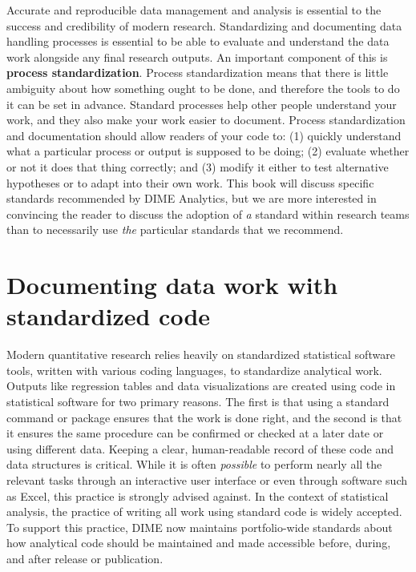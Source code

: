 {Accurate and reproducible data management and analysis
is essential to the success and credibility of modern research.
Standardizing and documenting data handling processes is essential
to be able to evaluate and understand
the data work alongside any final research outputs.
An important component of this is \textbf{process standardization}.
Process standardization means that there is
little ambiguity about how something ought to be done,
and therefore the tools to do it can be set in advance.
Standard processes help other people understand your work,
and they also make your work easier to document.
Process standardization and documentation should allow readers of your code to:
(1) quickly understand what a particular process or output is supposed to be doing;
(2) evaluate whether or not it does that thing correctly; and
(3) modify it either to test alternative hypotheses or to adapt into their own work.
This book will discuss specific standards recommended by DIME Analytics,
but we are more interested in convincing the reader
to discuss the adoption of \textit{a} standard within research teams
than to necessarily use \textit{the} particular standards that we recommend.


\section{Documenting data work with standardized code}

Modern quantitative research relies heavily
on standardized statistical software tools,
written with various coding languages, to standardize analytical work.
Outputs like regression tables and data visualizations
are created using code in statistical software for two primary reasons.
The first is that using a standard command or package ensures that the work is done right,
and the second is that it ensures the same procedure can be confirmed or checked
at a later date or using different data.
Keeping a clear, human-readable record of these code and data structures is critical.
While it is often \textit{possible} to perform nearly all the relevant tasks
through an interactive user interface or even through software such as Excel,
this practice is strongly advised against.
In the context of statistical analysis,
the practice of writing all work using standard code is widely accepted.
To support this practice, DIME now maintains portfolio-wide standards
about how analytical code should be maintained and made accessible
before, during, and after release or publication.

}
